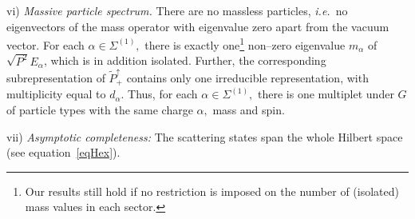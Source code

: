 \documentclass[a4paper,reqno,11pt]{amsart}
\theoremstyle{plain}
\theoremstyle{definition}
\numberwithin{equation}{section}
\newcommand{\Potild}{\tilde{P}_+^{\uparrow}}
\newcommand{\Sec}{\Sigma} %
\renewcommand{\sec}{\alpha}
\newcommand{\Sece}{\Sec^{(1)}} %
\newcommand{\Esec}{E_{\sec}}
\newcommand{\msec}{{m_{\sec}}}
\begin{document}
 vi) {\em Massive particle spectrum.} There are no massless particles,
 {\it i.e.\ }no eigenvectors of the mass operator with eigenvalue zero
   apart from the vacuum vector. For each $\sec\in\Sece,$ there
 is exactly one\footnote{Our results still hold if no restriction is
   imposed on the number of (isolated) mass values in each sector.}  
non--zero eigenvalue $\msec$ of $\sqrt{P^2}\Esec$, which is in 
addition isolated.  Further, the 
corresponding sub\-re\-presentation of $\Potild$ contains only one
irreducible representation, with multiplicity equal to 
$d_\sec.$ Thus, for each $\sec\in\Sece,$ there is one multiplet under $G$ of 
particle types with the same charge $\sec,$ mass and spin. 

 vii) {\em Asymptotic completeness:} The scattering states span the
 whole Hilbert space (see  equation~\eqref{eqHex}). 
\end{document}
